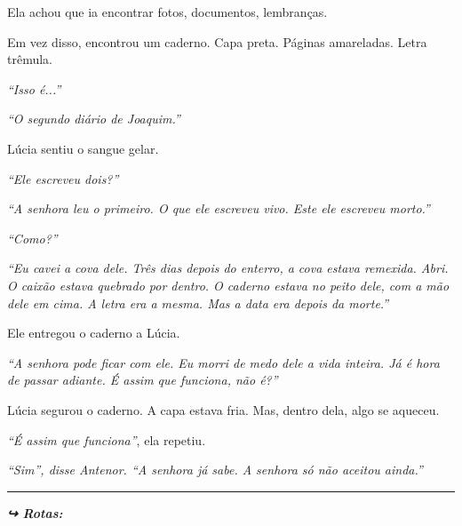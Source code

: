 \noindent Ela achou que ia encontrar fotos, documentos, lembranças.

\noindent Em vez disso, encontrou um caderno. Capa preta. Páginas amareladas. Letra trêmula.

\noindent \textit{\textquotedblleft{}Isso é...\textquotedblright{}}

\noindent \textit{\textquotedblleft{}O segundo diário de Joaquim.\textquotedblright{}}

\noindent Lúcia sentiu o sangue gelar.

\noindent \textit{\textquotedblleft{}Ele escreveu dois?\textquotedblright{}}

\noindent \textit{\textquotedblleft{}A senhora leu o primeiro. O que ele escreveu vivo. Este ele escreveu morto.\textquotedblright{}}

\noindent \textit{\textquotedblleft{}Como?\textquotedblright{}}

\noindent \textit{\textquotedblleft{}Eu cavei a cova dele. Três dias depois do enterro, a cova estava remexida. Abri. O caixão estava quebrado por dentro. O caderno estava no peito dele, com a mão dele em cima. A letra era a mesma. Mas a data era depois da morte.\textquotedblright{}}

\noindent Ele entregou o caderno a Lúcia.

\noindent \textit{\textquotedblleft{}A senhora pode ficar com ele. Eu morri de medo dele a vida inteira. Já é hora de passar adiante. É assim que funciona, não é?\textquotedblright{}}

\noindent Lúcia segurou o caderno. A capa estava fria. Mas, dentro dela, algo se aqueceu.

\noindent \textit{\textquotedblleft{}É assim que funciona\textquotedblright{}}, ela repetiu.

\noindent \textit{\textquotedblleft{}Sim\textquotedblright{}\textit{, disse Antenor. }\textquotedblleft{}A senhora já sabe. A senhora só não aceitou ainda.\textquotedblright{}}

\vspace{0.5em}\noindent\rule{\textwidth}{0.5pt}\vspace{0.5em}

\vspace{0.5em}
\noindent\textit{\textbf{↪ Rotas:}  \rotasep {}}
